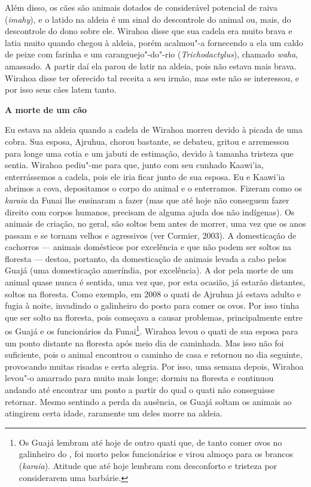 Além disso, os cães são animais dotados de considerável potencial de
raiva (\emph{imahy}), e o latido na aldeia é um sinal do descontrole do
animal ou, mais, do descontrole do dono sobre ele. Wirahoa disse que sua
cadela era muito brava e latia muito quando chegou à aldeia, porém
acalmou"-a fornecendo a ela um caldo de peixe com farinha e um
caranguejo"-do"-rio (\emph{Trichodactylus}), chamado \emph{waha},
amassado. A partir daí ela parou de latir na aldeia, pois não estava
mais brava. Wirahoa disse ter oferecido tal receita a seu irmão, mas
este não se interessou, e por isso seus cães latem tanto.

\textbf{A morte de um cão}

Eu estava na aldeia quando a cadela de Wirahoa morreu devido à picada de
uma cobra. Sua esposa, Ajruhua, chorou bastante, se debateu, gritou e
arremessou para longe uma cotia e um jabuti de estimação, devido à
tamanha tristeza que sentia. Wirahoa pediu"-me para que, junto com seu
cunhado Kaawi'ia, enterrássemos a cadela, pois ele iria ficar junto de
sua esposa. Eu e Kaawi'ia abrimos a cova, depositamos o corpo do animal
e o enterramos. Fizeram como os \emph{karaia} da Funai lhe ensinaram a
fazer (mas que até hoje não conseguem fazer direito com corpos humanos,
precisam de alguma ajuda dos não indígenas). Os animais de criação, no
geral, são soltos bem antes de morrer, uma vez que os anos passam e se
tornam velhos e agressivos (ver Cormier, 2003). A domesticação de
cachorros --- animais domésticos por excelência e que não podem ser soltos
na floresta --- destoa, portanto, da domesticação de animais levada a cabo
pelos Guajá (uma domesticação ameríndia, por excelência). A dor pela
morte de um animal quase nunca é sentida, uma vez que, por esta ocasião,
já estarão distantes, soltos na floresta. Como exemplo, em 2008 o quati
de Ajruhua já estava adulto e fugia à noite, invadindo o galinheiro do
posto para comer os ovos. Por isso tinha que ser solto na floresta, pois
começava a causar problemas, principalmente entre os Guajá e os
funcionários da Funai\footnote{Os Guajá lembram até hoje de outro quati
  que, de tanto comer ovos no galinheiro do , foi morto pelos
  funcionários e virou almoço para os brancos (\emph{karaia}). Atitude
  que até hoje lembram com desconforto e tristeza por considerarem uma
  barbárie.}. Wirahoa levou o quati de sua esposa para um ponto distante
na floresta após meio dia de caminhada. Mas isso não foi suficiente,
pois o animal encontrou o caminho de casa e retornou no dia seguinte,
provocando muitas risadas e certa alegria. Por isso, uma semana depois,
Wirahoa levou"-o amarrado para muito mais longe; dormiu na floresta e
continuou andando até encontrar um ponto a partir do qual o quati não
conseguisse retornar. Mesmo sentindo a perda da ausência, os Guajá
soltam os animais ao atingirem certa idade, raramente um deles morre na
aldeia.

